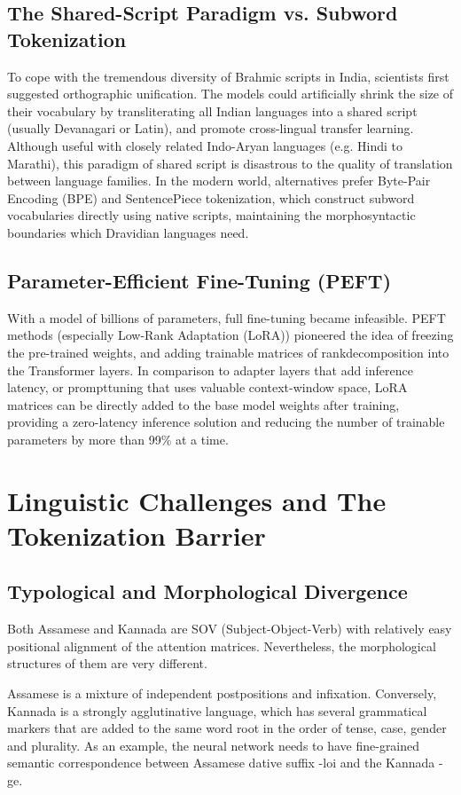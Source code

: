 \documentclass[conference]{IEEEtran}
\begin{document}
\subsection{The Shared-Script Paradigm vs. Subword Tokenization}
To cope with the tremendous diversity of Brahmic scripts in India, scientists first suggested orthographic unification. The models could artificially shrink the size of their vocabulary by transliterating all Indian languages into a shared script (usually Devanagari or Latin), and promote cross-lingual transfer learning. Although useful with closely related Indo-Aryan languages (e.g. Hindi to Marathi), this paradigm of shared script is disastrous to the quality of translation between language families. In the modern world, alternatives prefer Byte-Pair Encoding (BPE) and SentencePiece tokenization, which construct subword vocabularies directly using native scripts, maintaining the morphosyntactic boundaries which Dravidian languages need.

\subsection{Parameter-Efficient Fine-Tuning (PEFT)}
With a model of billions of parameters, full fine-tuning became infeasible. PEFT methods (especially Low-Rank Adaptation (LoRA)) pioneered the idea of freezing the pre-trained weights, and adding trainable matrices of rankdecomposition into the Transformer layers. In comparison to adapter layers that add inference latency, or prompttuning that uses valuable context-window space, LoRA matrices can be directly added to the base model weights after training, providing a zero-latency inference solution and reducing the number of trainable parameters by more than 99\% at a time.

\section{Linguistic Challenges and The Tokenization Barrier}

\subsection{Typological and Morphological Divergence}
Both Assamese and Kannada are SOV (Subject-Object-Verb) with relatively easy positional alignment of the attention matrices. Nevertheless, the morphological structures of them are very different.

Assamese is a mixture of independent postpositions and infixation. Conversely, Kannada is a strongly agglutinative language, which has several grammatical markers that are added to the same word root in the order of tense, case, gender and plurality. As an example, the neural network needs to have fine-grained semantic correspondence between Assamese dative suffix -loi and the Kannada -ge.
\end{document}
